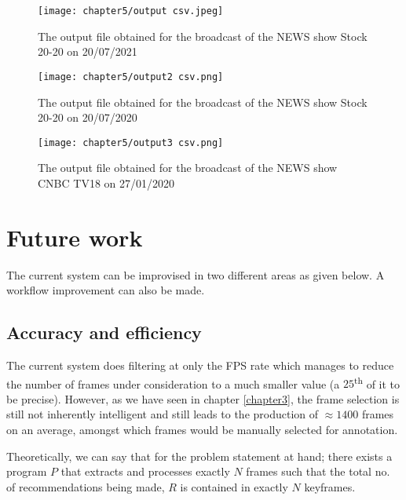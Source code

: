 \begin{figure}[h]
  \centering
  \texttt{[image: chapter5/output csv.jpeg]}
  \caption{The output file obtained for the broadcast of the NEWS show Stock 20-20 on 20/07/2021}
  \label{fig:out1}
\end{figure}

\begin{figure}[h]
  \centering
  \texttt{[image: chapter5/output2 csv.png]}
  \caption{The output file obtained for the broadcast of the NEWS show Stock 20-20 on 20/07/2020}
  \label{fig:out2}
\end{figure} \newpage

\begin{figure}[h]
  \centering
  \texttt{[image: chapter5/output3 csv.png]}
  \caption{The output file obtained for the broadcast of the NEWS show CNBC TV18 on 27/01/2020}
  \label{fig:out2}
\end{figure}


\section{Future work}

The current system can be improvised in two different areas as given below. A workflow improvement can also be made.

\subsection{Accuracy and efficiency}

The current system does filtering at only the FPS rate which manages to reduce the number of frames under consideration to a much smaller value (a $25$\textsuperscript{th} of it to be precise). However, as we have seen in chapter \ref{chapter3}, the frame selection is still not inherently intelligent and still leads to the production of  $ \approx 1400$ frames on an average, amongst which frames would be manually selected for annotation. \par

Theoretically, we can say that for the problem statement at hand; there exists a program $P$ that extracts and processes exactly $N$ frames such that the total no. of recommendations being made, $R$ is contained in exactly $N$ keyframes. \par

